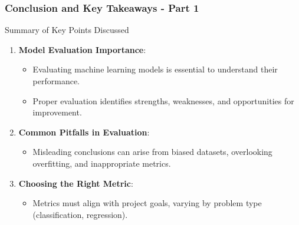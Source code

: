 \documentclass[aspectratio=169]{beamer}
\begin{document}
\begin{frame}[fragile]
  \frametitle{Conclusion and Key Takeaways - Part 1}
  
  \begin{block}{Summary of Key Points Discussed}
    \begin{enumerate}
      \item \textbf{Model Evaluation Importance}:
        \begin{itemize}
          \item Evaluating machine learning models is essential to understand their performance.
          \item Proper evaluation identifies strengths, weaknesses, and opportunities for improvement.
        \end{itemize}
        
      \item \textbf{Common Pitfalls in Evaluation}:
        \begin{itemize}
          \item Misleading conclusions can arise from biased datasets, overlooking overfitting, and inappropriate metrics.
        \end{itemize}
        
      \item \textbf{Choosing the Right Metric}:
        \begin{itemize}
          \item Metrics must align with project goals, varying by problem type (classification, regression).
        \end{itemize}
    \end{enumerate}
  \end{block}
\end{frame}
\end{document}
